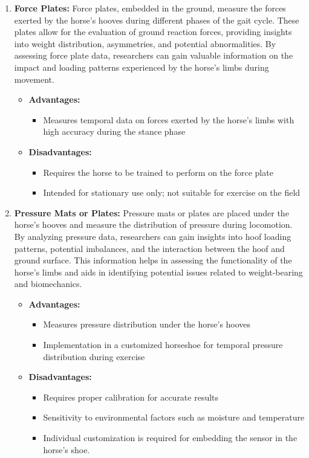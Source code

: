 \begin{enumerate}
\item \textbf{Force Plates:} Force plates, embedded in the ground, measure the forces exerted by the horse's hooves during different phases of the gait cycle. These plates allow for the evaluation of ground reaction forces, providing insights into weight distribution, asymmetries, and potential abnormalities. By assessing force plate data, researchers can gain valuable information on the impact and loading patterns experienced by the horse's limbs during movement.
\begin{itemize}
\item[] \textbf{\small Advantages:}
\begin{itemize}
\item Measures temporal data on forces exerted by the horse's limbs with high accuracy during the stance phase
\end{itemize}
\item[] \textbf{\small Disadvantages:}
\begin{itemize}
\item Requires the horse to be trained to perform on the force plate
\item Intended for stationary use only; not suitable for exercise on the field
\end{itemize}
\end{itemize}

\item \textbf{Pressure Mats or Plates:} Pressure mats or plates are placed under the horse's hooves and measure the distribution of pressure during locomotion. By analyzing pressure data, researchers can gain insights into hoof loading patterns, potential imbalances, and the interaction between the hoof and ground surface. This information helps in assessing the functionality of the horse's limbs and aids in identifying potential issues related to weight-bearing and biomechanics.
\begin{itemize}
\item[] \textbf{\small Advantages:}
\begin{itemize}
\item Measures pressure distribution under the horse's hooves
\item Implementation in a customized horseshoe for temporal pressure distribution during exercise
\end{itemize}
\item[] \textbf{\small Disadvantages:}
\begin{itemize}
\item Requires proper calibration for accurate results
\item Sensitivity to environmental factors such as moisture and temperature \cite{pressure}
\item Individual customization is required for embedding the sensor in the horse's shoe.
\end{itemize}
\end{itemize}


\end{enumerate}
